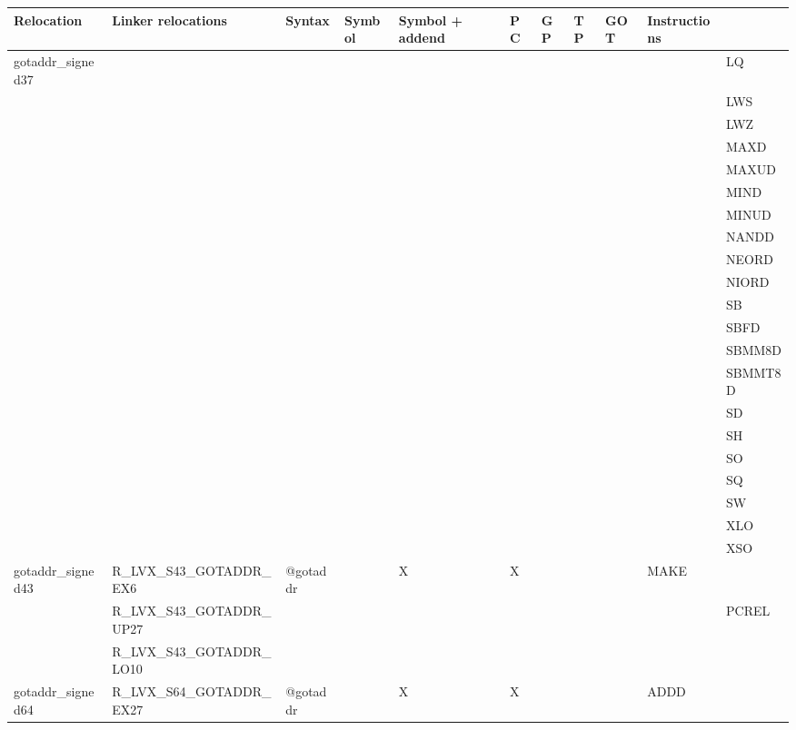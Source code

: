 {\tiny
\begin{tabular}{|l|l|l|l|l|l|l|l|l|l|l|} \hline
\textsf{Relocation} & \textsf{Linker relocations} & \textsf{Syntax} & \textsf{Symbol} & \textsf{Symbol + addend} & \textsf{PC} & \textsf{GP} & \textsf{TP} & \textsf{GOT} & \textsf{Instructions} \\
\hline
\textsf{gotaddr\_signed37} & & & & & & & & & & \textsf{LQ} \\
 & & & & & & & & & & \textsf{LWS} \\
 & & & & & & & & & & \textsf{LWZ} \\
 & & & & & & & & & & \textsf{MAXD} \\
 & & & & & & & & & & \textsf{MAXUD} \\
 & & & & & & & & & & \textsf{MIND} \\
 & & & & & & & & & & \textsf{MINUD} \\
 & & & & & & & & & & \textsf{NANDD} \\
 & & & & & & & & & & \textsf{NEORD} \\
 & & & & & & & & & & \textsf{NIORD} \\
 & & & & & & & & & & \textsf{SB} \\
 & & & & & & & & & & \textsf{SBFD} \\
 & & & & & & & & & & \textsf{SBMM8D} \\
 & & & & & & & & & & \textsf{SBMMT8D} \\
 & & & & & & & & & & \textsf{SD} \\
 & & & & & & & & & & \textsf{SH} \\
 & & & & & & & & & & \textsf{SO} \\
 & & & & & & & & & & \textsf{SQ} \\
 & & & & & & & & & & \textsf{SW} \\
 & & & & & & & & & & \textsf{XLO} \\
 & & & & & & & & & & \textsf{XSO} \\
\hline
\textsf{gotaddr\_signed43} & \textsf{R\_LVX\_S43\_GOTADDR\_EX6} & \textsf{@gotaddr} & \textsf{} & \textsf{X} & \textsf{X} & \textsf{} & \textsf{} & \textsf{} & \textsf{MAKE} \\
 & \textsf{R\_LVX\_S43\_GOTADDR\_UP27} & & & & & & & & & \textsf{PCREL} \\
 & \textsf{R\_LVX\_S43\_GOTADDR\_LO10} & & & & & & & & & \\
\hline
\textsf{gotaddr\_signed64} & \textsf{R\_LVX\_S64\_GOTADDR\_EX27} & \textsf{@gotaddr} & \textsf{} & \textsf{X} & \textsf{X} & \textsf{} & \textsf{} & \textsf{} & \textsf{ADDD} \\

\end{tabular}}
